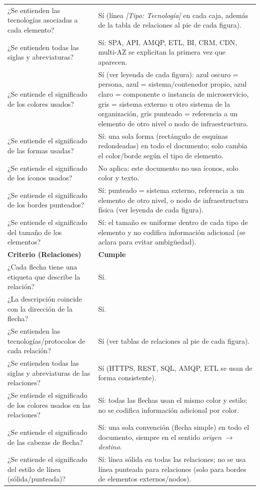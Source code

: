 \documentclass[12pt,a4paper]{article}
\begin{document}
\begin{longtable}{L{9.5cm}L{4.5cm}}
¿Se entienden las tecnologías asociadas a cada elemento? & Sí (línea \textit{[Tipo: Tecnología]} en
cada caja, además de la tabla de relaciones al pie de cada figura).\\
¿Se entienden todas las siglas y abreviaturas? & Sí: SPA, API, AMQP, ETL, BI, CRM, CDN, multi-AZ se explicitan la primera vez que aparecen.\\
¿Se entiende el significado de los colores usados? & Sí (ver leyenda de cada figura): azul oscuro = persona, azul = sistema/contenedor propio, azul claro = componente o instancia de microservicio, gris = sistema externo u otro sistema de la organización, gris punteado = referencia a un elemento de otro nivel o nodo de infraestructura.\\
¿Se entiende el significado de las formas usadas? & Sí: una sola forma (rectángulo de esquinas redondeadas) en todo el documento; solo cambia el color/borde según el tipo de elemento.\\
¿Se entiende el significado de los íconos usados? & No aplica: este documento no usa íconos, solo color y texto.\\
¿Se entiende el significado de los bordes punteados? & Sí: punteado = sistema externo, referencia a un elemento de otro nivel, o nodo de infraestructura física (ver leyenda de cada figura).\\
¿Se entiende el significado del tamaño de los elementos? & Sí: el tamaño es uniforme dentro de cada tipo de elemento y no codifica información adicional (se aclara para evitar ambigüedad).\\
\midrule
\textbf{Criterio (Relaciones)} & \textbf{Cumple}\\
\midrule
¿Cada flecha tiene una etiqueta que describe la relación? & Sí.\\
¿La descripción coincide con la dirección de la flecha? & Sí.\\
¿Se entienden las tecnologías/protocolos de cada relación? & Sí (ver tablas de relaciones al pie de cada figura).\\
¿Se entienden todas las siglas y abreviaturas de las relaciones? & Sí (HTTPS, REST, SQL, AMQP, ETL se usan de forma consistente).\\
¿Se entiende el significado de los colores usados en las relaciones? & Sí: todas las flechas usan el mismo color y estilo; no se codifica información adicional por color.\\
¿Se entiende el significado de las cabezas de flecha? & Sí: una sola convención (flecha simple) en todo el documento, siempre en el sentido \textit{origen} $\rightarrow$ \textit{destino}.\\
¿Se entiende el significado del estilo de línea (sólida/punteada)? & Sí: línea sólida en todas las relaciones; no se usa línea punteada para relaciones (solo para bordes de elementos externos/nodos).\\
\end{longtable}
\end{document}
